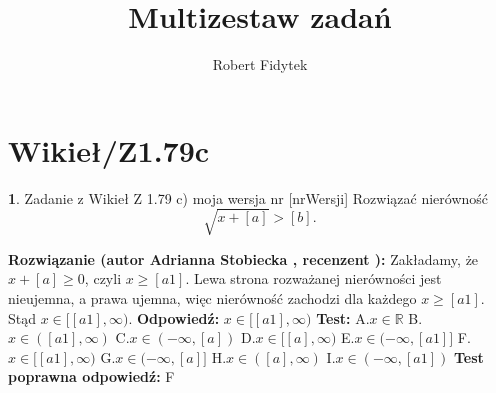 \documentclass[12pt, a4paper]{article}
\title{Multizestaw zadań}
\author{Robert Fidytek}
\date{}
\theoremstyle{definition} %
\newtheorem{zad}{}
\newcommand{\kategoria}[1]{\section{#1}} %
\newcommand{\zadStart}[1]{\begin{zad}#1\newline} %
\newcommand{\zadStop}{\end{zad}}   %
\newcommand{\rozwStart}[2]{\noindent \textbf{Rozwiązanie (autor #1 , recenzent #2): }\newline} %
\newcommand{\rozwStop}{\newline}                                            %
\newcommand{\odpStart}{\noindent \textbf{Odpowiedź:}\newline}    %
\newcommand{\odpStop}{\newline}                                             %
\newcommand{\testStart}{\noindent \textbf{Test:}\newline} %
\newcommand{\testStop}{\newline} %
\newcommand{\kluczStart}{\noindent \textbf{Test poprawna odpowiedź:}\newline} %
\newcommand{\kluczStop}{\newline} %
\begin{document}
\maketitle


\kategoria{Wikieł/Z1.79c}
\zadStart{Zadanie z Wikieł Z 1.79 c) moja wersja nr [nrWersji]}
Rozwiązać nierówność
$$\sqrt{x+[a]}>[b].$$
\zadStop
\rozwStart{Adrianna Stobiecka}{}
Zakładamy, że $x+[a]\geq0$, czyli $x\geq[a1]$. Lewa strona rozważanej nierówności jest nieujemna, a prawa ujemna, więc nierówność zachodzi dla każdego $x\geq[a1]$. Stąd $x\in[[a1],\infty)$.
\rozwStop
\odpStart
 $x\in[[a1],\infty)$
\odpStop
\testStart
A.$x\in\mathbb{R}$
B.$x\in([a1],\infty)$
C.$x\in(-\infty,[a])$
D.$x\in[[a],\infty)$
E.$x\in(-\infty,[a1]]$
F.$x\in[[a1],\infty)$
G.$x\in(-\infty,[a]]$
H.$x\in([a],\infty)$
I.$x\in(-\infty,[a1])$
\testStop
\kluczStart
F
\kluczStop
\end{document}
